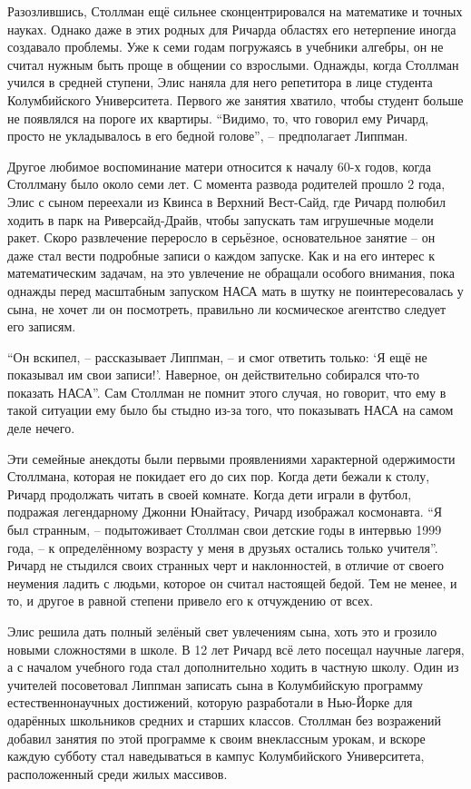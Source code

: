 Разозлившись, Столлман ещё сильнее сконцентрировался на математике и точных науках. Однако даже в этих родных для Ричарда областях его нетерпение иногда создавало проблемы. Уже к семи годам погружаясь в учебники алгебры, он не считал нужным быть проще в общении со взрослыми. Однажды, когда Столлман учился в средней ступени, Элис наняла для него репетитора в лице студента Колумбийского Университета. Первого же занятия хватило, чтобы студент больше не появлялся на пороге их квартиры. \enquote{Видимо, то, что говорил ему Ричард, просто не укладывалось в его бедной голове}, -- предполагает Липпман.

Другое любимое воспоминание матери относится к началу 60-х годов, когда Столлману было около семи лет. С момента развода родителей прошло 2 года, Элис с сыном переехали из Квинса в Верхний Вест-Сайд, где Ричард полюбил ходить в парк на Риверсайд-Драйв, чтобы запускать там игрушечные модели ракет. Скоро развлечение переросло в серьёзное, основательное занятие -- он даже стал вести подробные записи о каждом запуске. Как и на его интерес к математическим задачам, на это увлечение не обращали особого внимания, пока однажды перед масштабным запуском НАСА мать в шутку не поинтересовалась у сына, не хочет ли он посмотреть, правильно ли космическое агентство следует его записям.

\enquote{Он вскипел, -- рассказывает Липпман, -- и смог ответить только: `Я ещё не показывал им свои записи!'. Наверное, он действительно собирался что-то показать НАСА}. Сам Столлман не помнит этого случая, но говорит, что ему в такой ситуации ему было бы стыдно из-за того, что показывать НАСА на самом деле нечего.

Эти семейные анекдоты были первыми проявлениями характерной одержимости Столлмана, которая не покидает его до сих пор. Когда дети бежали к столу, Ричард продолжать читать в своей комнате. Когда дети играли в футбол, подражая легендарному Джонни Юнайтасу, Ричард изображал космонавта. \enquote{Я был странным, -- подытоживает Столлман свои детские годы в интервью 1999 года, -- к определённому возрасту у меня в друзьях остались только учителя}. Ричард не стыдился своих странных черт и наклонностей, в отличие от своего неумения ладить с людьми, которое он считал настоящей бедой. Тем не менее, и то, и другое в равной степени привело его к отчуждению от всех.

Элис решила дать полный зелёный свет увлечениям сына, хоть это и грозило новыми сложностями в школе. В 12 лет Ричард всё лето посещал научные лагеря, а с началом учебного года стал дополнительно ходить в частную школу. Один из учителей посоветовал Липпман записать сына в Колумбийскую программу естественнонаучных достижений, которую разработали в Нью-Йорке для одарённых школьников средних и старших классов. Столлман без возражений добавил занятия по этой программе к своим внеклассным урокам, и вскоре каждую субботу стал наведываться в кампус Колумбийского Университета, расположенный среди жилых массивов.

